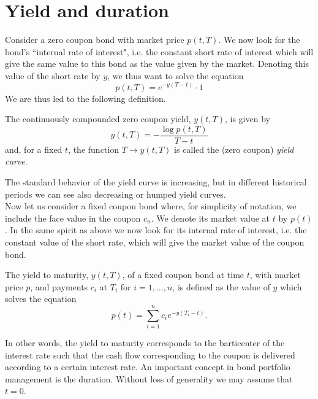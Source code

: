 \section{Yield and duration}
Consider a zero coupon bond with market price $p(t,T)$. We now look for the bond's ``internal rate of interest", i.e. the constant short rate of interest which will give the same value to this bond as the value given by the market. Denoting this value of the short rate by $y$, we thus want to solve the equation
\begin{equation}
    p(t,T) = e^{-y(T-t)}\cdot 1
\end{equation}
We are thus led to the following definition.
\begin{definition}
The continuously compounded zero coupon yield, $y(t, T )$, is given by
\begin{equation}
    y(t,T) = -\frac{\log p(t,T)}{T-t}
\end{equation}
and, for a fixed $t$, the function $T \to y(t,T)$ is called the (zero coupon) \emph{yield curve}.
\end{definition} %
The standard behavior of the yield curve is increasing, but in different historical periods we can see also decreasing or humped yield curves.\\
Now let us consider a fixed coupon bond where, for simplicity of notation, we include the face value in the coupon $c_n$. We denote its market value at $t$ by $p(t)$. In the same spirit as above we now look for its internal rate of interest, i.e. the constant value of the short rate, which will give the market value of the coupon bond.
\begin{definition}
    The yield to maturity, $y(t,T)$, of a fixed coupon bond at time $t$, with market price $p$, and payments $c_i$ at $T_i$ for $i = 1,\dots,n$, is defined as the value of $y$ which solves the equation
    \begin{equation}
        p(t) = \sum^n_{i=1} c_i e^{-y(T_i-t)}.
    \end{equation}
\end{definition}
In other words, the yield to maturity corresponds to the barticenter of the interest rate such that the cash flow corresponding to the coupon is delivered according to a certain interest rate. %
An important concept in bond portfolio management is the duration. Without loss of generality we may assume that $t = 0$.
